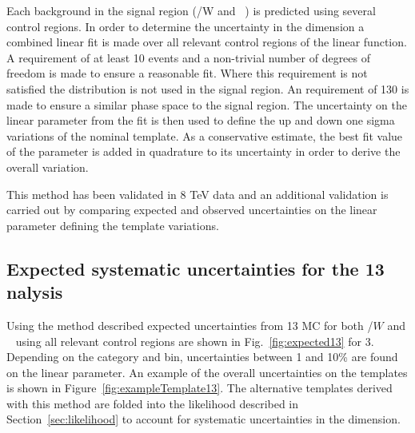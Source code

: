 Each background in the signal region (\ttbar/W  and \zInv~) is predicted  using several control regions. 
In order to determine the uncertainty in the \mht dimension a combined linear fit is made over all relevant control regions
of the linear function. A requirement of at least 10 events and a non-trivial number of degrees of freedom
 is made to ensure a reasonable fit. Where this requirement is not satisfied the \mht distribution is not used in the signal region.
An \mht requirement of 130 \GeV is made to ensure a similar phase space to the signal region.
The uncertainty on the linear parameter from the fit is then used to define the up and down one sigma variations of the nominal template.
As a conservative estimate, the best fit value of the parameter is added in quadrature to its uncertainty in order to derive the overall variation.

This method has been validated in 8 TeV data and an additional validation is carried out by comparing expected and observed uncertainties
on the linear parameter defining the template variations.



\subsection{Expected systematic uncertainties for the 13 \texorpdfstring{\TeV} analysis}
Using the method described expected uncertainties from 13 \TeV MC for both \ttbar/$W$  and \zInv~ using all relevant control regions are
shown in Fig.~\ref{fig:expected13} for 3\ifb.  Depending on the category and \scalht bin, uncertainties between 1 and 10\% are found
on the linear parameter. An example of the overall uncertainties on the \mht templates is shown
in Figure~\ref{fig:exampleTemplate13}. The alternative templates derived with this method are folded into the 
likelihood described in Section~\ref{sec:likelihood} to account for systematic uncertainties in the \mht dimension.


